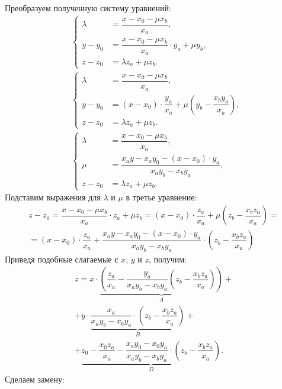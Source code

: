 Преобразуем полученную систему уравнений:
\begin{align*}
& \left\{
\begin{aligned}
	\lambda &= \dfrac{x - x_0 - \mu x_b}{x_a},\\
	y - y_0 &= \dfrac{x - x_0 - \mu x_b}{x_a} \cdot y_a + \mu y_b,\\
	z - z_0 &= \lambda z_a + \mu z_b.
\end{aligned}\right.\\
& \left\{
\begin{aligned}
	\lambda &= \dfrac{x - x_0 - \mu x_b}{x_a},\\
	y - y_0 &= (x - x_0) \cdot \dfrac{y_a}{x_a} + \mu \left(y_b - \dfrac{x_b y_a}{x_a} \right),\\
	z - z_0 &= \lambda z_a + \mu z_b.
\end{aligned}\right.\\
&\left\{
\begin{aligned}
	\lambda &= \dfrac{x - x_0 - \mu x_b}{x_a},\\
	\mu &= \dfrac{x_a y - x_a y_0 - (x - x_0) \cdot y_a}{x_a y_b - x_b y_a},\\
	z - z_0 &= \lambda z_a + \mu z_b.
\end{aligned}\right.
\end{align*}
Подставим выражения для $\lambda$ и $\mu$ в третье уравнение:
\begin{multline*}
    z - z_0 = \dfrac{x - x_0 - \mu x_b}{x_a} \cdot z_a + \mu z_b = (x - x_0) \cdot \dfrac{z_a}{x_a} + \mu \left( z_b - \dfrac{x_b z_a}{x_a} \right) = \\
    = (x - x_0) \cdot \dfrac{z_a}{x_a} + \dfrac{x_a y - x_a y_0 - (x - x_0) \cdot y_a}{x_a y_b - x_b y_a} \cdot \left( z_b - \dfrac{x_b z_a}{x_a} \right)
\end{multline*}
Приведя подобные слагаемые с $x$, $y$ и $z$, получим:
\begin{multline*}
z = x \cdot \underbrace{\left( \dfrac{z_a}{x_a} - \dfrac{y_a}{x_a y_b - x_b y_a} \left( z_b - \dfrac{x_b z_a}{x_a} \right) \right)}_A +\\
+ y \cdot \underbrace{\dfrac{x_a}{x_a y_b - x_b y_a} \cdot \left( z_b - \dfrac{x_b z_a}{x_a} \right)}_B +\\
+ \underbrace{z_0 - \dfrac{x_0 z_a}{x_a} - \dfrac{x_a y_0 - x_0 y_a}{x_a y_b - x_b y_a} \cdot \left( z_b - \dfrac{x_b z_a}{x_a} \right)}_D.
\end{multline*}
Сделаем замену:
